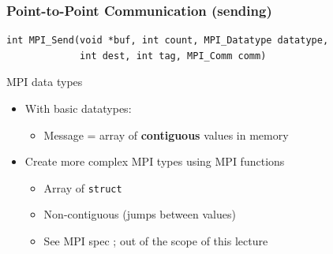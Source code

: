 \documentclass[xcolor={x11names,svgnames,psnames}]{beamer}
\begin{document}
\begin{frame}[fragile=singleslide]
  \frametitle{Point-to-Point Communication (sending)}

\begin{verbatim}
int MPI_Send(void *buf, int count, MPI_Datatype datatype,
             int dest, int tag, MPI_Comm comm)
\end{verbatim}

  \begin{alertblock}{MPI data types}
    \begin{itemize}
    \item With basic datatypes:
      \begin{itemize}
      \item Message = array of \textbf{contiguous} values in memory
      \end{itemize}

    \item Create more complex MPI types using MPI functions
      \begin{itemize}
      \item Array of \texttt{struct}
      \item Non-contiguous (jumps between values)
      \item See MPI spec ; out of the scope of this lecture
      \end{itemize}
    \end{itemize}
  \end{alertblock}
\end{frame}

\end{document}
